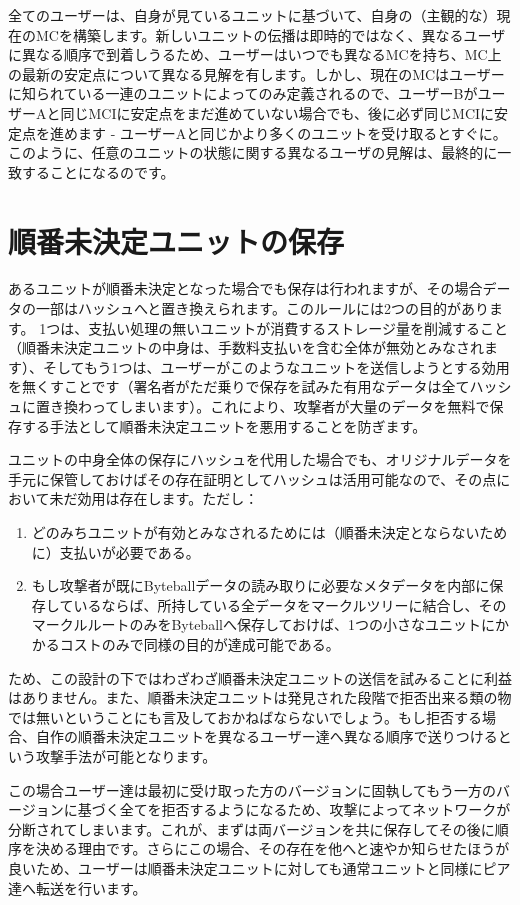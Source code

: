 \documentclass[a4paper, dvipdfmx]{jsarticle}
\begin{document}
全てのユーザーは、自身が見ているユニットに基づいて、自身の（主観的な）現在のMCを構築します。新しいユニットの伝播は即時的ではなく、異なるユーザに異なる順序で到着しうるため、ユーザーはいつでも異なるMCを持ち、MC上の最新の安定点について異なる見解を有します。しかし、現在のMCはユーザーに知られている一連のユニットによってのみ定義されるので、ユーザーBがユーザーAと同じMCIに安定点をまだ進めていない場合でも、後に必ず同じMCIに安定点を進めます - ユーザーAと同じかより多くのユニットを受け取るとすぐに。このように、任意のユニットの状態に関する異なるユーザの見解は、最終的に一致することになるのです。

\section{順番未決定ユニットの保存}
あるユニットが順番未決定となった場合でも保存は行われますが、その場合データの一部はハッシュへと置き換えられます。このルールには2つの目的があります。 1つは、支払い処理の無いユニットが消費するストレージ量を削減すること（順番未決定ユニットの中身は、手数料支払いを含む全体が無効とみなされます）、そしてもう1つは、ユーザーがこのようなユニットを送信しようとする効用を無くすことです（署名者がただ乗りで保存を試みた有用なデータは全てハッシュに置き換わってしまいます）。これにより、攻撃者が大量のデータを無料で保存する手法として順番未決定ユニットを悪用することを防ぎます。

ユニットの中身全体の保存にハッシュを代用した場合でも、オリジナルデータを手元に保管しておけばその存在証明としてハッシュは活用可能なので、その点において未だ効用は存在します。ただし：
\begin{enumerate}
        \item どのみちユニットが有効とみなされるためには（順番未決定とならないために）支払いが必要である。
        \item もし攻撃者が既にByteballデータの読み取りに必要なメタデータを内部に保存しているならば、所持している全データをマークルツリーに結合し、そのマークルルートのみをByteballへ保存しておけば、1つの小さなユニットにかかるコストのみで同様の目的が達成可能である。
\end{enumerate}

ため、この設計の下ではわざわざ順番未決定ユニットの送信を試みることに利益はありません。また、順番未決定ユニットは発見された段階で拒否出来る類の物では無いということにも言及しておかねばならないでしょう。もし拒否する場合、自作の順番未決定ユニットを異なるユーザー達へ異なる順序で送りつけるという攻撃手法が可能となります。

この場合ユーザー達は最初に受け取った方のバージョンに固執してもう一方のバージョンに基づく全てを拒否するようになるため、攻撃によってネットワークが分断されてしまいます。これが、まずは両バージョンを共に保存してその後に順序を決める理由です。さらにこの場合、その存在を他へと速やか知らせたほうが良いため、ユーザーは順番未決定ユニットに対しても通常ユニットと同様にピア達へ転送を行います。
\end{document}
